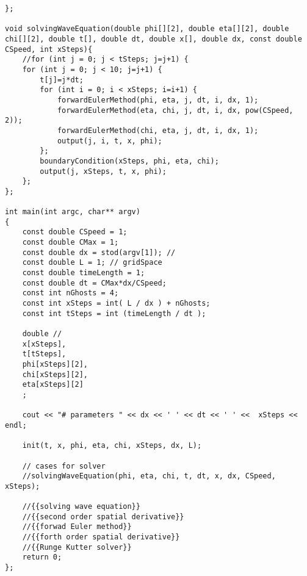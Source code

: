 \documentclass[10pt,fleqn,reqno,a4paper]{article}
\begin{document}
\begin{verbatim}
};

void solvingWaveEquation(double phi[][2], double eta[][2], double chi[][2], double t[], double dt, double x[], double dx, const double CSpeed, int xSteps){
    //for (int j = 0; j < tSteps; j=j+1) {
    for (int j = 0; j < 10; j=j+1) {
        t[j]=j*dt;
        for (int i = 0; i < xSteps; i=i+1) {
            forwardEulerMethod(phi, eta, j, dt, i, dx, 1);
            forwardEulerMethod(eta, chi, j, dt, i, dx, pow(CSpeed, 2));
            forwardEulerMethod(chi, eta, j, dt, i, dx, 1);
            output(j, i, t, x, phi);
        };
        boundaryCondition(xSteps, phi, eta, chi);
        output(j, xSteps, t, x, phi);
    };
};

int main(int argc, char** argv)
{
    const double CSpeed = 1;
    const double CMax = 1;
    const double dx = stod(argv[1]); //
    const double L = 1; // gridSpace
    const double timeLength = 1;
    const double dt = CMax*dx/CSpeed;
    const int nGhosts = 4;
    const int xSteps = int( L / dx ) + nGhosts;
    const int tSteps = int (timeLength / dt );

    double //
    x[xSteps],
    t[tSteps],
    phi[xSteps][2],
    chi[xSteps][2],
    eta[xSteps][2]
    ;

    cout << "# parameters " << dx << ' ' << dt << ' ' <<  xSteps << endl;

    init(t, x, phi, eta, chi, xSteps, dx, L);

    // cases for solver
    //solvingWaveEquation(phi, eta, chi, t, dt, x, dx, CSpeed, xSteps);

    //{{solving wave equation}}
    //{{second order spatial derivative}}
    //{{forwad Euler method}}
    //{{forth order spatial derivative}}
    //{{Runge Kutter solver}}
	return 0;
};
\end{verbatim}
\end{document}
